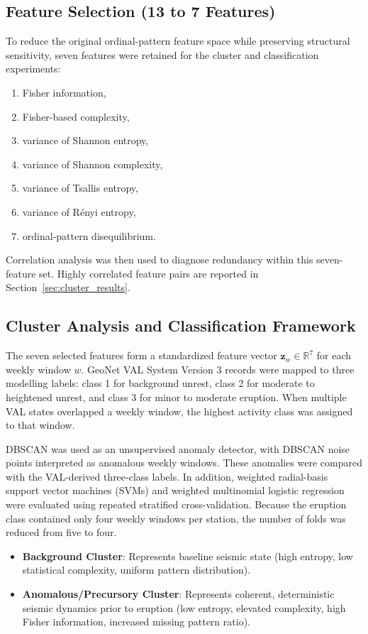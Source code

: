 \documentclass[journal]{IEEEtran}
\begin{document}
\subsection{Feature Selection (13 to 7 Features)}
To reduce the original ordinal-pattern feature space while preserving structural sensitivity, seven features were retained for the cluster and classification experiments:
\begin{enumerate}
    \item Fisher information,
    \item Fisher-based complexity,
    \item variance of Shannon entropy,
    \item variance of Shannon complexity,
    \item variance of Tsallis entropy,
    \item variance of Rényi entropy,
    \item ordinal-pattern disequilibrium.
\end{enumerate}
Correlation analysis was then used to diagnose redundancy within this seven-feature set. Highly correlated feature pairs are reported in Section~\ref{sec:cluster_results}.

\subsection{Cluster Analysis and Classification Framework}
The seven selected features form a standardized feature vector $\mathbf{z}_w \in \mathbb{R}^7$ for each weekly window $w$. GeoNet VAL System Version 3 records were mapped to three modelling labels: class 1 for background unrest, class 2 for moderate to heightened unrest, and class 3 for minor to moderate eruption. When multiple VAL states overlapped a weekly window, the highest activity class was assigned to that window.

DBSCAN was used as an unsupervised anomaly detector, with DBSCAN noise points interpreted as anomalous weekly windows. These anomalies were compared with the VAL-derived three-class labels. In addition, weighted radial-basis support vector machines (SVMs) and weighted multinomial logistic regression were evaluated using repeated stratified cross-validation. Because the eruption class contained only four weekly windows per station, the number of folds was reduced from five to four.
\begin{itemize}
    \item \textbf{Background Cluster}: Represents baseline seismic state (high entropy, low statistical complexity, uniform pattern distribution).
    \item \textbf{Anomalous/Precursory Cluster}: Represents coherent, deterministic seismic dynamics prior to eruption (low entropy, elevated complexity, high Fisher information, increased missing pattern ratio).
\end{itemize}
\end{document}
